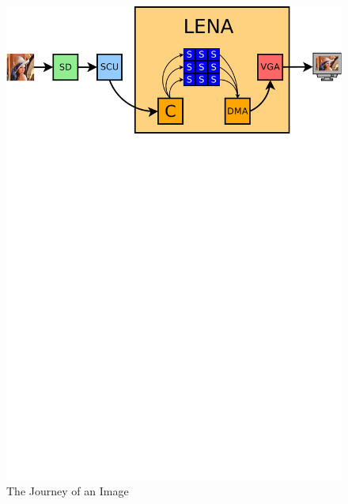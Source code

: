\begin{figure}[h]
  \centering
  \includegraphics[width=\linewidth,clip,trim=0 21.5cm 0 0]
                  {fig/sys-over/journey.pdf}
  \caption{The Journey of an Image}
  \label{fig:image-journey}
\end{figure}
